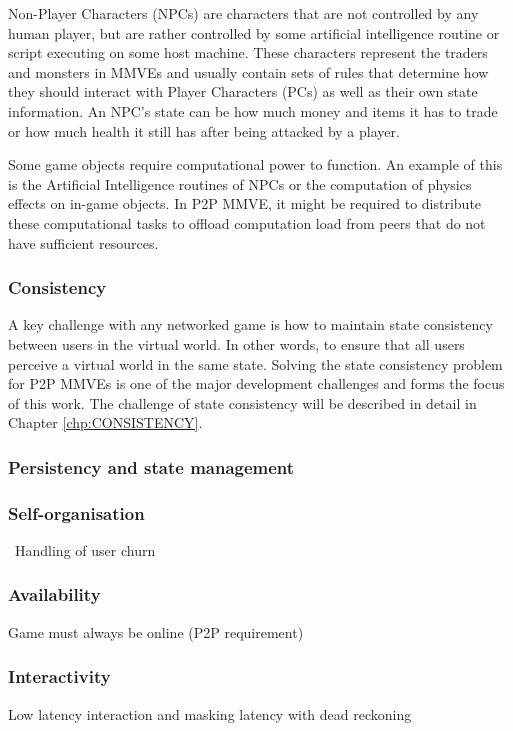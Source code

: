 Non-Player Characters (NPCs) are characters that are not controlled by any human player, but are rather controlled by some artificial intelligence routine or script executing on some host machine. These characters represent the traders and monsters in MMVEs and usually contain sets of rules that determine how they should interact with Player Characters (PCs) as well as their own state information. An NPC's state can be how much money and items it has to trade or how much health it still has after being attacked by a player.

Some game objects require computational power to function. An example of this is the Artificial Intelligence routines of NPCs or the computation of physics effects on in-game objects. In P2P MMVE, it might be required to distribute these computational tasks to offload computation load from peers that do not have sufficient resources.

\subsubsection{Consistency}
A key challenge with any networked game is how to maintain state consistency between users in the virtual world. In other words, to ensure that all users perceive a virtual world in the same state. Solving the state consistency problem for P2P MMVEs is one of the major development challenges and forms the focus of this work. The challenge of state consistency will be described in detail in Chapter \ref{chp:CONSISTENCY}.

\subsubsection{Persistency and state management}

\subsubsection{Self-organisation}\
Handling of user churn

\subsubsection{Availability}
Game must always be online (P2P requirement)

\subsubsection{Interactivity}
Low latency interaction and masking latency with dead reckoning

